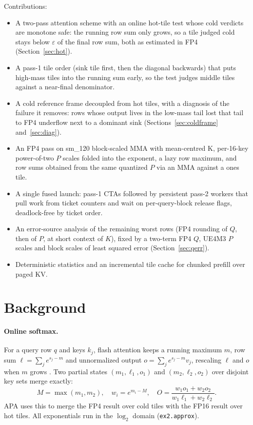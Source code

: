 \documentclass[10pt,twocolumn]{article}
\newcommand{\eps}{\varepsilon}
\newcommand{\code}[1]{\texttt{#1}}
\begin{document}
Contributions:
\begin{itemize}
\item A two-pass attention scheme with an online hot-tile test whose cold verdicts are monotone safe: the
  running row sum only grows, so a tile judged cold stays below $\eps$ of the final row sum, both as estimated
  in FP4 (Section~\ref{sec:hot}).
\item A pass-1 tile order (sink tile first, then the diagonal backwards) that puts high-mass tiles into the
  running sum early, so the test judges middle tiles against a near-final denominator.
\item A cold reference frame decoupled from hot tiles, with a diagnosis of the failure it removes: rows whose
  output lives in the low-mass tail lost that tail to FP4 underflow next to a dominant sink
  (Sections~\ref{sec:coldframe} and~\ref{sec:diag}).
\item An FP4 pass on sm\_120 block-scaled MMA with mean-centred K, per-16-key power-of-two $P$ scales folded
  into the exponent, a lazy row maximum, and row sums obtained from the same quantized $P$ via an MMA
  against a ones tile.
\item A single fused launch: pass-1 CTAs followed by persistent pass-2 workers that pull work from ticket
  counters and wait on per-query-block release flags, deadlock-free by ticket order.
\item An error-source analysis of the remaining worst rows (FP4 rounding of $Q$, then of $P$, at short context of
  $K$), fixed by a two-term FP4 $Q$, UE4M3 $P$ scales and block scales of least squared error
  (Section~\ref{sec:qerr}).
\item Deterministic statistics and an incremental tile cache for chunked prefill over paged KV.
\end{itemize}

\section{Background}

\paragraph{Online softmax.} For a query row $q$ and keys $k_j$, flash attention keeps a running maximum $m$,
row sum $\ell=\sum_j e^{s_j-m}$ and unnormalized output $o=\sum_j e^{s_j-m}v_j$, rescaling $\ell$ and $o$
when $m$ grows \cite{milakov2018online,rabe2021selfattention}. Two partial states $(m_1,\ell_1,o_1)$ and
$(m_2,\ell_2,o_2)$ over disjoint key sets merge exactly:
\begin{equation}
M=\max(m_1,m_2),\quad w_i=e^{m_i-M},\quad O=\frac{w_1o_1+w_2o_2}{w_1\ell_1+w_2\ell_2}.
\label{eq:merge}
\end{equation}
APA uses this to merge the FP4 result over cold tiles with the FP16 result over hot tiles. All exponentials
run in the $\log_2$ domain (\code{ex2.approx}).
\end{document}
